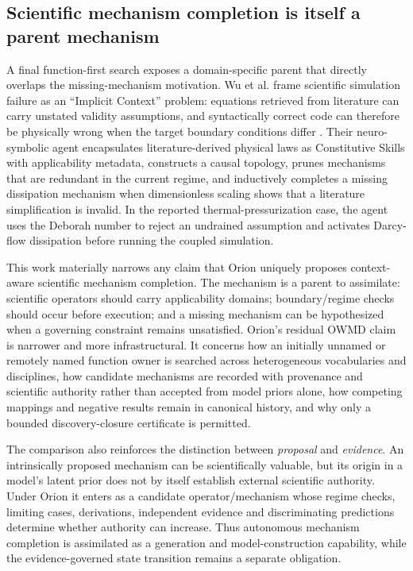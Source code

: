 \subsection{Scientific mechanism completion is itself a parent mechanism}

A final function-first search exposes a domain-specific parent that directly overlaps the missing-mechanism motivation. Wu et al. frame scientific simulation failure as an ``Implicit Context'' problem: equations retrieved from literature can carry unstated validity assumptions, and syntactically correct code can therefore be physically wrong when the target boundary conditions differ \cite{wu2026epistemicclosure}. Their neuro-symbolic agent encapsulates literature-derived physical laws as Constitutive Skills with applicability metadata, constructs a causal topology, prunes mechanisms that are redundant in the current regime, and inductively completes a missing dissipation mechanism when dimensionless scaling shows that a literature simplification is invalid. In the reported thermal-pressurization case, the agent uses the Deborah number to reject an undrained assumption and activates Darcy-flow dissipation before running the coupled simulation.

This work materially narrows any claim that Orion uniquely proposes context-aware scientific mechanism completion. The mechanism is a parent to assimilate: scientific operators should carry applicability domains; boundary/regime checks should occur before execution; and a missing mechanism can be hypothesized when a governing constraint remains unsatisfied. Orion's residual OWMD claim is narrower and more infrastructural. It concerns how an initially unnamed or remotely named function owner is searched across heterogeneous vocabularies and disciplines, how candidate mechanisms are recorded with provenance and scientific authority rather than accepted from model priors alone, how competing mappings and negative results remain in canonical history, and why only a bounded discovery-closure certificate is permitted.

The comparison also reinforces the distinction between \emph{proposal} and \emph{evidence}. An intrinsically proposed mechanism can be scientifically valuable, but its origin in a model's latent prior does not by itself establish external scientific authority. Under Orion it enters as a candidate operator/mechanism whose regime checks, limiting cases, derivations, independent evidence and discriminating predictions determine whether authority can increase. Thus autonomous mechanism completion is assimilated as a generation and model-construction capability, while the evidence-governed state transition remains a separate obligation.
